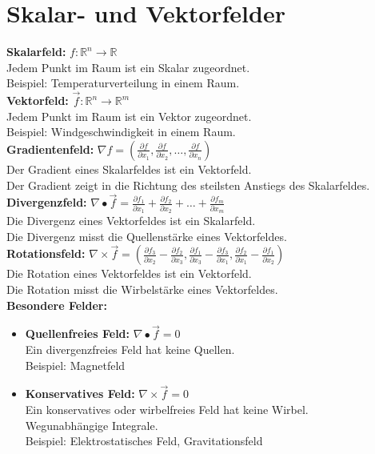 \documentclass[german]{latex4ei/latex4ei_sheet}
\begin{document}
\section{Skalar- und Vektorfelder}
\begin{sectionbox}
    \textbf{Skalarfeld:} $f: \mathbb{R}^n \to \mathbb{R}$\\
    Jedem Punkt im Raum ist ein Skalar zugeordnet.\\
    Beispiel: Temperaturverteilung in einem Raum.\\

    \textbf{Vektorfeld:} $\vec{f}: \mathbb{R}^n \to \mathbb{R}^m$\\
    Jedem Punkt im Raum ist ein Vektor zugeordnet.\\
    Beispiel: Windgeschwindigkeit in einem Raum.\\

    \textbf{Gradientenfeld:} $\nabla f = \left( \frac{\partial f}{\partial x_1}, \frac{\partial f}{\partial x_2}, \ldots, \frac{\partial f}{\partial x_n} \right)$\\
    Der Gradient eines Skalarfeldes ist ein Vektorfeld.\\
    Der Gradient zeigt in die Richtung des steilsten Anstiegs des Skalarfeldes.\\

    \textbf{Divergenzfeld:} $\nabla \bullet \vec{f} = \frac{\partial f_1}{\partial x_1} + \frac{\partial f_2}{\partial x_2} + \ldots + \frac{\partial f_m}{\partial x_m}$\\
    Die Divergenz eines Vektorfeldes ist ein Skalarfeld.\\
    Die Divergenz misst die Quellenstärke eines Vektorfeldes.\\

    \textbf{Rotationsfeld:} $\nabla \times \vec{f} = \left( \frac{\partial f_3}{\partial x_2} - \frac{\partial f_2}{\partial x_3}, \frac{\partial f_1}{\partial x_3} - \frac{\partial f_3}{\partial x_1}, \frac{\partial f_2}{\partial x_1} - \frac{\partial f_1}{\partial x_2} \right)$\\
    Die Rotation eines Vektorfeldes ist ein Vektorfeld.\\
    Die Rotation misst die Wirbelstärke eines Vektorfeldes.\\

    \textbf{Besondere Felder:}
    \begin{itemize}
        \item \textbf{Quellenfreies Feld:} $\nabla \bullet \vec{f} = 0$\\
        Ein divergenzfreies Feld hat keine Quellen.\\
        Beispiel: Magnetfeld
        \item \textbf{Konservatives Feld:} $\nabla \times \vec{f} = 0$\\
        Ein konservatives oder wirbelfreies Feld hat keine Wirbel.\\
        Wegunabhängige Integrale.\\
        Beispiel: Elektrostatisches Feld, Gravitationsfeld \\
    \end{itemize}


\end{sectionbox}
\end{document}
